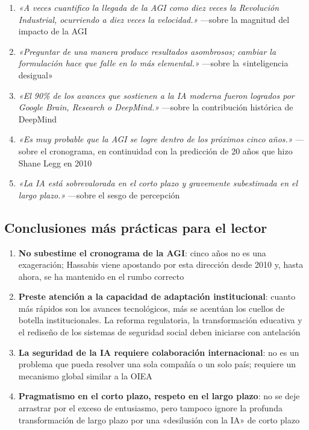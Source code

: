 \documentclass[a4paper]{article}
\begin{document}
\begin{enumerate}
    \item \textit{«A veces cuantifico la llegada de la AGI como diez veces la Revolución Industrial, ocurriendo a diez veces la velocidad.»} —sobre la magnitud del impacto de la AGI
    \item \textit{«Preguntar de una manera produce resultados asombrosos; cambiar la formulación hace que falle en lo más elemental.»} —sobre la «inteligencia desigual»
    \item \textit{«El 90\% de los avances que sostienen a la IA moderna fueron logrados por Google Brain, Research o DeepMind.»} —sobre la contribución histórica de DeepMind
    \item \textit{«Es muy probable que la AGI se logre dentro de los próximos cinco años.»} —sobre el cronograma, en continuidad con la predicción de 20 años que hizo Shane Legg en 2010
    \item \textit{«La IA está sobrevalorada en el corto plazo y gravemente subestimada en el largo plazo.»} —sobre el sesgo de percepción
\end{enumerate}

\subsection{Conclusiones más prácticas para el lector}

\begin{enumerate}
    \item \textbf{No subestime el cronograma de la AGI}: cinco años no es una exageración; Hassabis viene apostando por esta dirección desde 2010 y, hasta ahora, se ha mantenido en el rumbo correcto
    \item \textbf{Preste atención a la capacidad de adaptación institucional}: cuanto más rápidos son los avances tecnológicos, más se acentúan los cuellos de botella institucionales. La reforma regulatoria, la transformación educativa y el rediseño de los sistemas de seguridad social deben iniciarse con antelación
    \item \textbf{La seguridad de la IA requiere colaboración internacional}: no es un problema que pueda resolver una sola compañía o un solo país; requiere un mecanismo global similar a la OIEA
    \item \textbf{Pragmatismo en el corto plazo, respeto en el largo plazo}: no se deje arrastrar por el exceso de entusiasmo, pero tampoco ignore la profunda transformación de largo plazo por una «desilusión con la IA» de corto plazo
\end{enumerate}
\end{document}
